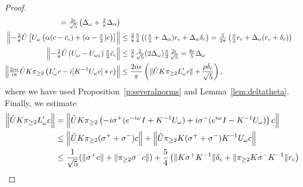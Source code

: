 \begin{proof}
\begin{alignat*}{1}
	=   \tfrac{2 \epsilon }{\sqrt{5}} \left(  \Delta_\omega + \tfrac{2}{\pi}\Delta_\alpha \right) \nonumber \\
	\left\| 	-\tfrac{2}{\pi} \hat{U} \left[  U_\omega \left(  \alpha ( c - \bar{c}_\epsilon) + ( \alpha - \tfrac{\pi}{2}) c  \right) \right]  \right\|
	& \leq \tfrac{2}{\pi}  \tfrac{5}{4} \left(  (\tfrac{\pi}{2} + \Delta_\alpha) r_c + \Delta_\alpha \delta_c  \right)
	= \tfrac{5}{2\pi} \left( \tfrac{\pi}{2} r_c + \Delta_\alpha ( r_c + \delta_c) \right) \nonumber \\
	\left\| -\tfrac{2}{\pi} \hat{U} 
	\left( U_\omega - U_{\omega_0} \right) \tfrac{\pi}{2} \bar{c}_\epsilon   \right\| 
	&\leq  \tfrac{2}{\pi}  \tfrac{2}{\sqrt{5}} (2 \Delta_\omega)  \tfrac{\pi}{2} \tfrac{2 \epsilon}{\sqrt{5}} 
	=   \tfrac{8 \epsilon}{5} \Delta_\omega \nonumber \\
	\left\|\tfrac{2 \alpha \epsilon}{i \pi} \hat{U} K \pi_{\geq 2} \left(  L_{\omega}' c - i [ K^{-1} U_\omega c ] *c  \right)  \right\|
	&\leq \frac{2 \alpha \epsilon}{ \pi}  \left( \| \hat{U}  K \pi_{\geq 2} L_{\omega}' c  \| +  \frac{ \rho \delta_c   }{\sqrt{5}}\right) ,
	\end{alignat*} 
where we have used Proposition~\ref{p:severalnorms} and Lemma~\ref{lem:deltatheta}.
Finally, we estimate 
	\begin{alignat}{1}
	\left\| \hat{U} K \pi_{\geq 2} L_{\omega}' c \right\| &= 
	\left \| \hat{U}  K \pi_{\geq 2} \left(- i \sigma^+( e^{- i \omega} I + K^{-1} U_{\omega}) + i \sigma^-(e^{i \omega} I - K^{-1} U_{\omega}) \right) c \right\| \nonumber \\
	&\leq \left \| \hat{U}  K \pi_{\geq 2}( \sigma^+ + \sigma^- ) c  \right \| + 
	\left \| \hat{U} \pi_{\geq 2} K ( \sigma^+ + \sigma^- ) K^{-1}  U_{\omega} c  \right \|  \nonumber  \\
	&\leq  \frac{1}{\sqrt{5}} ( \| \sigma^+ c\| + \|\pi_{\geq 2}\sigma^- c\|) + \frac{5}{4} \left( \| K \sigma^+ K^{-1} \| \dc  +  \| \pi_{\geq 2} K \sigma^- K^{-1} \| r_c \right) \nonumber  \\

\end{alignat}
\end{proof}

